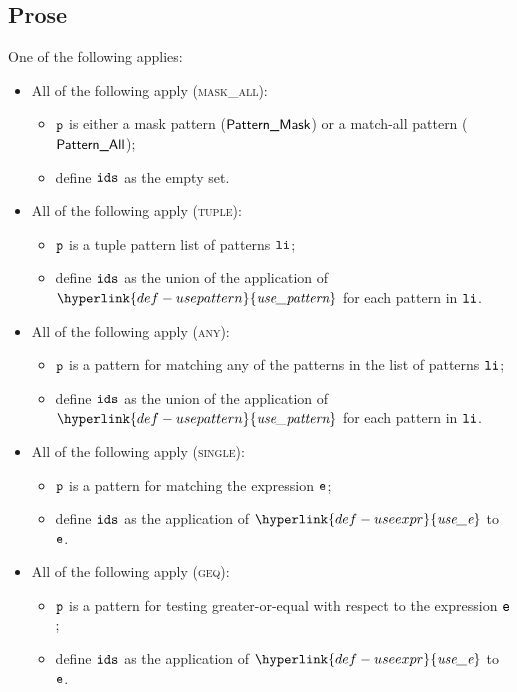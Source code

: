 \documentclass{book}
\newcommand\useexpr[0]{\hyperlink{def-useexpr}{\textfunc{use\_e}}}
\newcommand\usepattern[0]{\hyperlink{def-usepattern}{\textfunc{use\_pattern}}}
\begin{document}
\subsection{Prose}
One of the following applies:
\begin{itemize}
  \item All of the following apply (\textsc{mask\_all}):
  \begin{itemize}
    \item $\texttt{p}$ is either a mask pattern ($\textsf{Pattern\_Mask}$) or a match-all pattern ($\textsf{Pattern\_All}$);
    \item define $\texttt{ids}$ as the empty set.
  \end{itemize}

  \item All of the following apply (\textsc{tuple}):
  \begin{itemize}
    \item $\texttt{p}$ is a tuple pattern list of patterns $\texttt{li}$;
    \item define $\texttt{ids}$ as the union of the application of $\usepattern$ for each pattern in $\texttt{li}$.
  \end{itemize}

  \item All of the following apply (\textsc{any}):
  \begin{itemize}
    \item $\texttt{p}$ is a pattern for matching any of the patterns in the list of patterns $\texttt{li}$;
    \item define $\texttt{ids}$ as the union of the application of $\usepattern$ for each pattern in $\texttt{li}$.
  \end{itemize}

  \item All of the following apply (\textsc{single}):
  \begin{itemize}
    \item $\texttt{p}$ is a pattern for matching the expression $\texttt{e}$;
    \item define $\texttt{ids}$ as the application of $\useexpr$ to $\texttt{e}$.
  \end{itemize}

  \item All of the following apply (\textsc{geq}):
  \begin{itemize}
    \item $\texttt{p}$ is a pattern for testing greater-or-equal with respect to the expression $\texttt{e}$;
    \item define $\texttt{ids}$ as the application of $\useexpr$ to $\texttt{e}$.
  \end{itemize}


\end{itemize}
\end{document}
